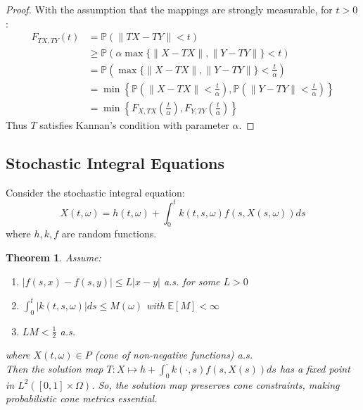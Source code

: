 \documentclass{amsart}
\newtheorem{theorem}{Theorem}[section]
\theoremstyle{definition}
\theoremstyle{remark}
\numberwithin{equation}{section}
\begin{document}
\begin{proof}
 With the assumption that the mappings are strongly measurable, for $t > 0$:
\begin{align*}
F_{TX,TY}(t) &= \mathbb{P}(\|TX - TY\| < t) \\
&\geq \mathbb{P}\left(\alpha \max\{\|X - TX\|, \|Y - TY\| \} < t\right) \\
&= \mathbb{P}\left(\max\{\|X - TX\|, \|Y - TY\| \} < \frac{t}{\alpha}\right) \\
&= \min\left\{ \mathbb{P}\left(\|X - TX\| < \frac{t}{\alpha}\right), \mathbb{P}\left(\|Y - TY\| < \frac{t}{\alpha}\right) \right\} \\
&= \min\left\{ F_{X,TX}\left(\frac{t}{\alpha}\right), F_{Y,TY}\left(\frac{t}{\alpha}\right) \right\}
\end{align*}
Thus $T$ satisfies Kannan's condition with parameter $\alpha$.
\end{proof}

\subsection{Stochastic Integral Equations}

Consider the stochastic integral equation:
\[
X(t,\omega) = h(t,\omega) + \int_0^t k(t,s,\omega)f(s,X(s,\omega))ds
\]
where $h,k,f$ are random functions.

\begin{theorem}\label{thm:integral}
Assume:
\begin{enumerate}
    \item $|f(s,x) - f(s,y)| \leq L|x-y|$ a.s. for some $L > 0$
    \item $\int_0^t |k(t,s,\omega)|ds \leq M(\omega)$ with $\mathbb{E}[M] < \infty$
    \item $LM < \frac{1}{2}$ a.s.
\end{enumerate}
where $X(t,\omega) \in P$ (cone of non-negative functions) a.s.  \\
Then the solution map $T:X \mapsto h + \int_0^\cdot k(\cdot,s)f(s,X(s))ds$ has a fixed point in $L^2([0,1] \times \Omega)$. So, the solution map preserves cone constraints, making probabilistic cone metrics essential.
\end{theorem}
\end{document}
